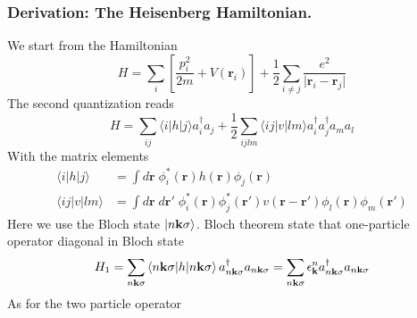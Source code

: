 \documentclass[../../../main.tex]{subfiles}
\begin{document}
\subsubsection{Derivation: The Heisenberg Hamiltonian.}
We start from the Hamiltonian
\begin{equation*}
    H = \sum_{i}\left[\frac{p_i^2}{2m}+V(\mathbf{r}_i)\right]+\frac{1}{2}\sum_{i\neq j}\frac{e^2}{\lvert\mathbf{r}_i-\mathbf{r}_j\rvert}
\end{equation*}
The second quantization reads
\begin{equation*}
    H = \sum_{ij}\langle i|h|j\rangle a_{i}^{\dagger}a_{j} +\frac{1}{2}\sum_{ijlm}\langle ij|v|lm\rangle a_{i}^{\dagger}a_{j}^{\dagger}a_{m}a_{l}
\end{equation*}
With the matrix elements
\begin{align*}
    \langle i|h|j\rangle   & = \int d \mathbf{r}\;\phi_{i}^{*}(\mathbf{r}) h(\mathbf{r}) \phi_{j}(\mathbf{r})                                                                              \\
    \langle ij|v|lm\rangle & = \int d \mathbf{r} \;d \mathbf{r}'\; \phi_{i}^{*}(\mathbf{r}) \phi_{j}^{*}(\mathbf{r}') v(\mathbf{r}-\mathbf{r}') \phi_{l}(\mathbf{r}) \phi_{m}(\mathbf{r}')
\end{align*}
Here we use the Bloch state $\ket{n \mathbf{k }\sigma}$.
Bloch theorem state that one-particle operator diagonal in Bloch state
\begin{equation*}
    H_1 = \sum_{n\mathbf{k}  \sigma} \braket{n \mathbf{k }\sigma  | h | n \mathbf{k }\sigma} a^\dagger_{n \mathbf{k} \sigma} a_{  n \mathbf{k} \sigma}
    = \sum_{n\mathbf{k}  \sigma} \epsilon_{\mathbf{k }} ^{n} a^\dagger_{n\mathbf{k}  \sigma} a_{n \mathbf{k} \sigma}
\end{equation*}
As for the two particle operator
\end{document}
